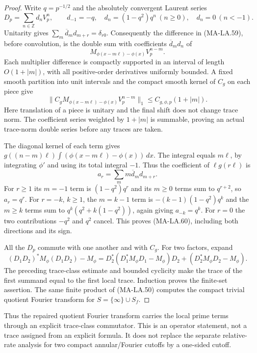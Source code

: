 \begin{proof}
Write $q=p^{-1/2}$ and the absolutely convergent Laurent series
\[
 D_p=\sum_{n\in\mathbb Z}d_nV_p^n,\qquad
 d_{-1}=-q,\quad d_n=(1-q^2)q^n\ (n\ge0),\quad
 d_n=0\ (n<-1).
 \tag{MA-LA.61}
\]
Unitarity gives $\sum_m\overline d_m d_{m+r}=\delta_{r0}$.
Consequently the difference in (MA-LA.59), before convolution,
is the double sum with coefficients $\overline d_m d_n$ of
\[
    M_{\phi(x-m\ell)-\phi(x)}V_p^{n-m}.
 \tag{MA-LA.62}
\]
Each multiplier difference is compactly supported in an interval
of length $O(1+|m|)$, with all positive-order derivatives
uniformly bounded.  A fixed smooth partition into unit intervals
and the compact smooth kernel of $C_g$ on each piece give
\[
 \bigl\|C_gM_{\phi(x-m\ell)-\phi(x)}V_p^{n-m}\bigr\|_1
                         \le C_{g,\phi,p}(1+|m|).
 \tag{MA-LA.63}
\]
Here translation of a piece is unitary and the final shift
does not change trace norm.  The coefficient series weighted
by $1+|m|$ is summable, proving an actual trace-norm double
series before any traces are taken.

The diagonal kernel of each term gives
$g((n-m)\ell)\int(\phi(x-m\ell)-\phi(x))\,dx$.
The integral equals $m\ell$, by integrating $\phi'$ and
using its total integral $-1$.  Thus the coefficient of
$\ell g(r\ell)$ is
\[
                  a_r=\sum_m m\overline d_m d_{m+r}.
 \tag{MA-LA.64}
\]
For $r\ge1$ its $m=-1$ term is $(1-q^2)q^r$ and its
$m\ge0$ terms sum to $q^{r+2}$, so $a_r=q^r$.
For $r=-k$, $k\ge1$, the $m=k-1$ term is
$-(k-1)(1-q^2)q^k$ and the $m\ge k$ terms sum to
$q^k(q^2+k(1-q^2))$, again giving $a_{-k}=q^k$.
For $r=0$ the two contributions $-q^2$ and $q^2$ cancel.
This proves (MA-LA.60), including both directions and its sign.

All the $D_p$ commute with one another and with $C_g$.
For two factors, expand
\[
 (D_1D_2)^*M_\phi(D_1D_2)-M_\phi
 =D_2^*(D_1^*M_\phi D_1-M_\phi)D_2
                  +(D_2^*M_\phi D_2-M_\phi).
\]
The preceding trace-class estimate and bounded cyclicity make
the trace of the first summand equal to the first local trace.
Induction proves the finite-set assertion.  The same finite
product of (MA-LA.50) computes the compact trivial quotient
Fourier transform for $S=\{\infty\}\cup S_f$.
\end{proof}

Thus the repaired quotient Fourier transform carries the local
prime terms through an explicit trace-class commutator.  This
is an operator statement, not a trace assigned from an explicit
formula.  It does not replace the separate relative-rate analysis
for two compact annular/Fourier cutoffs by a one-sided cutoff.

